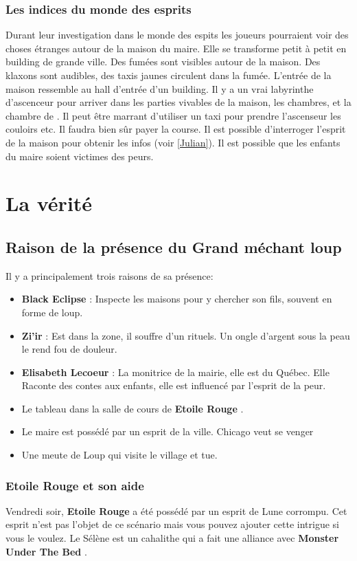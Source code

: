 \documentclass[oneside,12pt]{book}
\newcommand{\Lynn}{\textbf{Etoile Rouge} }
\newcommand{\Monster}{\textbf{Monster Under The Bed} }
\newcommand{\BlackEclipse}{\textbf{Black Eclipse} }
\newcommand{\Elisabeth}{\textbf{Elisabeth Lecoeur} }
\newcommand{\Thomas}{\textbf{Zi'ir} }
\begin{document}
\begin{flushleft}
\subsection{Les indices du monde des esprits}
Durant leur investigation dans le monde des espits les joueurs pourraient voir des choses étranges autour de la maison du maire. 
Elle se transforme petit à petit en building de grande ville. Des fumées sont visibles autour de la maison. Des klaxons sont audibles, des taxis jaunes circulent dans la fumée. 
L'entrée de la maison ressemble au hall d'entrée d'un building. Il y a un vrai labyrinthe d'ascenceur pour arriver dans les parties vivables de la maison, les chambres, et la chambre de \Julian. Il peut être marrant d'utiliser un taxi pour prendre l'ascenseur les couloirs etc. Il faudra bien sûr payer la course. 
Il est possible d'interroger l'esprit de la maison pour obtenir les infos (voir \ref{Julian}). Il est possible que les enfants du maire soient victimes des peurs. 




\chapter{La vérité}


\section{Raison de la présence du Grand méchant loup}
Il y a principalement trois raisons de sa présence: 
\begin{itemize}
\item \BlackEclipse : Inspecte les maisons pour y chercher son fils, souvent en forme de loup. 
\item \Thomas : Est dans la zone, il souffre d'un rituels. Un ongle d'argent sous la peau le rend fou de douleur.
\item \Elisabeth : La monitrice de la mairie, elle est du Québec. Elle Raconte des contes aux enfants, elle est influencé par l'esprit de la peur.
\item Le tableau dans la salle de cours de \Lynn. 
\item Le maire est possédé par un esprit de la ville. Chicago veut se venger
\item Une meute de Loup qui visite le village et tue.
\end{itemize}

\subsection{\Lynn et son aide}
Vendredi soir, \Lynn a été possédé par un esprit de Lune corrompu. Cet esprit n'est pas l'objet de ce scénario mais vous pouvez ajouter cette intrigue si vous le voulez. Le Sélène est un cahalithe qui a fait une alliance avec \Monster .



\end{flushleft}
\end{document}
